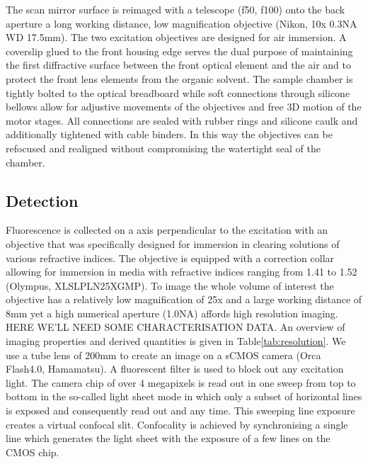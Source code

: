 \documentclass[12pt]{spieman}  %
\begin{document}
The scan mirror surface is reimaged with a telescope (f50, f100) onto the back aperture a long working distance, low magnification objective (Nikon, 10x 0.3NA WD 17.5mm). The two excitation objectives are designed for air immersion. A coverslip glued to the front housing edge serves the dual purpose of maintaining the first diffractive surface between the front optical element and the air and to protect the front lens elements from the organic solvent. The sample chamber is tightly bolted  to the optical breadboard while soft connections through silicone bellows allow for adjustive movements of the objectives and free 3D motion of the motor stages. All connections are sealed with rubber rings and silicone caulk and additionally tightened with cable binders. In this way the objectives can be refocused and realigned without compromising the watertight seal of the chamber. 

	
		\subsection{Detection}
		
		Fluorescence is collected on a axis perpendicular to the excitation with an objective that was specifically designed for immersion in clearing solutions of various refractive indices. The objective is equipped with a correction collar allowing for immersion in media with refractive indices ranging from 1.41 to 1.52 (Olympus, XLSLPLN25XGMP). To image the whole volume of interest the objective has a relatively low magnification of 25x and a large working distance of 8mm yet a high numerical aperture (1.0NA) affords high resolution imaging. HERE WE'LL NEED SOME CHARACTERISATION DATA. An overview of imaging properties and derived quantities is given in Table\ref{tab:resolution}. We use a tube lens of 200mm to create an image on a sCMOS camera (Orca Flash4.0, Hamamatsu). A fluorescent filter is used to block out any excitation light. The camera chip of over 4 megapixels is read out in one sweep from top to bottom in the so-called light sheet mode in which only a subset of horizontal lines is exposed and consequently read out and any time. This sweeping line exposure creates a virtual confocal slit. Confocality is achieved by synchronising a single line which generates the light sheet with the exposure of a few lines on the CMOS chip.
		
\end{document}
